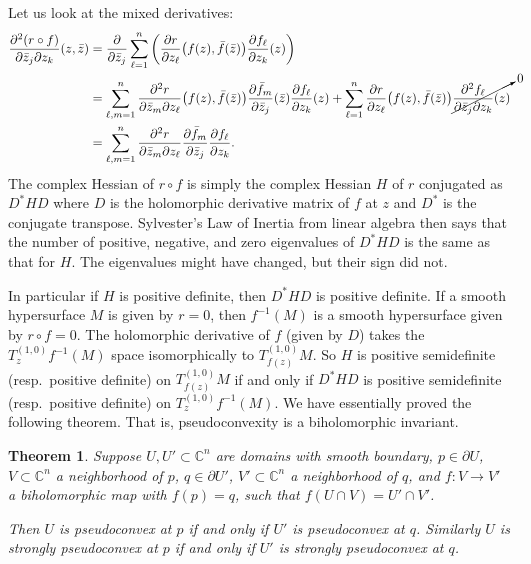 \documentclass[12pt,openany]{book}
\newcommand{\C}{{\mathbb{C}}}
\theoremstyle{plain}
\newtheorem{thm}{Theorem}[section]
\theoremstyle{remark}
\theoremstyle{definition}
\theoremstyle{exercise}
\theoremstyle{example}
\begin{document}
Let us look at the mixed derivatives:
\begin{equation*}
\begin{split}
\frac{\partial^2 (r \circ f)}{\partial \bar{z}_j \partial z_k} (z,\bar{z})
& =
\frac{\partial}{\partial \bar{z}_j }
\sum_{\ell=1}^n 
\left(
\frac{\partial r}{\partial z_\ell} \bigl(f(z),\bar{f}(\bar{z})\bigr)
\frac{\partial f_\ell}{\partial z_k} (z) 
\right)
\\
& =
\sum_{\ell,m=1}^n 
\frac{\partial^2 r}{\partial \bar{z}_m \partial z_\ell }
\bigl(f(z),\bar{f}(\bar{z})\bigr)
\frac{\partial \bar{f}_m}{\partial \bar{z}_j} (\bar{z}) 
\frac{\partial f_\ell}{\partial z_k} (z) 
+
\sum_{\ell=1}^n 
\frac{\partial r}{\partial z_\ell} \bigl(f(z),\bar{f}(\bar{z})\bigr)
\cancelto{0}{\frac{\partial^2 f_\ell}{\partial \bar{z}_j \partial z_k} (z)}
\\
&=
\sum_{\ell,m=1}^n 
\frac{\partial^2 r}{\partial \bar{z}_m \partial z_\ell}
\frac{\partial \bar{f}_m}{\partial \bar{z}_j} 
\frac{\partial f_\ell}{\partial z_k} .
\end{split}
\end{equation*}
The complex Hessian of $r \circ f$ is simply the complex Hessian $H$ of $r$
conjugated as $D^*HD$ where $D$ is the holomorphic
derivative matrix of $f$ at $z$ and
$D^*$ is the conjugate transpose.  Sylvester's Law of Inertia from linear
algebra then says that the number of positive, negative, and zero
eigenvalues of $D^*HD$ is the same as that for $H$.  The
eigenvalues might have changed, but their sign did not.

In particular if $H$ is positive definite, then $D^*HD$ is positive
definite.  If a smooth hypersurface $M$ is given by $r=0$, then $f^{-1}(M)$ is
a smooth hypersurface given by $r \circ f = 0$.
The holomorphic derivative of $f$ (given by $D$)
takes the
$T_{z}^{(1,0)}f^{-1}(M)$
space isomorphically to
$T_{f(z)}^{(1,0)}M$.
So $H$ is positive semidefinite (resp.\ positive definite)
on $T_{f(z)}^{(1,0)}M$ if and only if $D^*HD$ is positive semidefinite
(resp.\ positive definite) on
$T_{z}^{(1,0)} f^{-1}(M)$.
We have essentially proved the following theorem.  That is, pseudoconvexity is a
biholomorphic invariant.

\begin{thm}
Suppose $U, U' \subset \C^n$ are domains with smooth boundary,
$p \in \partial U$, $V \subset \C^n$ a neighborhood of $p$,
$q \in \partial U'$, $V' \subset \C^n$ a neighborhood of $q$,
and $f \colon V \to V'$ a biholomorphic map with $f(p) = q$, such that
$f(U \cap V) = U' \cap V'$.

Then $U$ is pseudoconvex at $p$ if and only if $U'$ is pseudoconvex at $q$.
Similarly
$U$ is strongly pseudoconvex at $p$ if and only if $U'$ is strongly pseudoconvex at $q$.
\end{thm}
\end{document}

